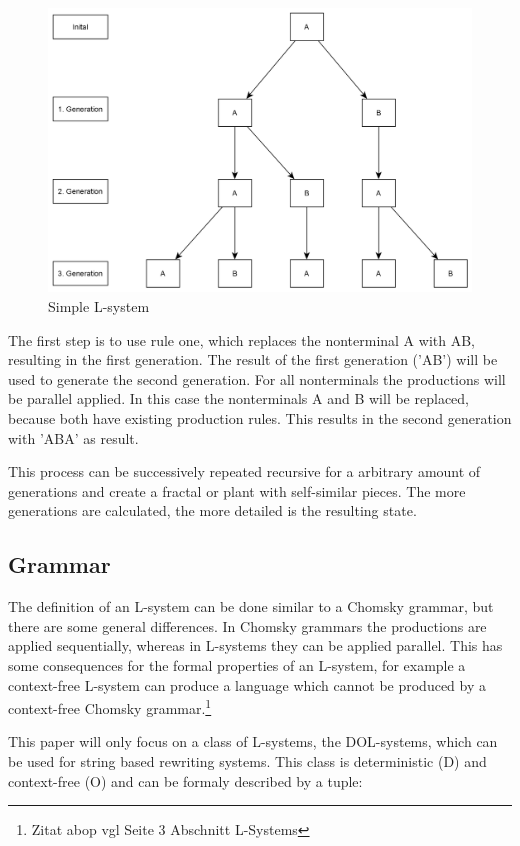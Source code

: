 \documentclass[english]{cpp-hmwk}
\begin{document}
\begin{figure}[h!]
	\centering
	\includegraphics[width=0.7\columnwidth]{../graphs/Examples/simple_lsystem.png}
	\caption{Simple L-system}
	\label{figure:simple_lsystem}
\end{figure}

The first step is to use rule one, which replaces the nonterminal A with AB, resulting in the first generation. The result of the first generation ('AB') will be used to generate the second generation. For all nonterminals the productions will be parallel applied. In this case the nonterminals A and B will be replaced, because both have existing production rules. This results in the second generation with 'ABA' as result.

This process can be successively repeated recursive for a arbitrary amount of generations and create a fractal or plant with self-similar pieces. The more generations are calculated, the more detailed is the resulting state. 

\subsection{Grammar}
\label{section:grammar}
The definition of an L-system can be done similar to a Chomsky grammar, but there are some general differences. In Chomsky grammars the productions are applied sequentially, whereas in L-systems they can be applied parallel. This has some consequences for the formal properties of an L-system, for example a context-free L-system can produce a language which cannot be produced by a context-free Chomsky grammar.\footnote{Zitat abop vgl Seite 3  Abschnitt L-Systems}

\noindent This paper will only focus on a class of L-systems, the DOL-systems, which can be used for string based rewriting systems. This class is deterministic (D) and context-free (O) and can be formaly described  by a tuple:
\end{document}

